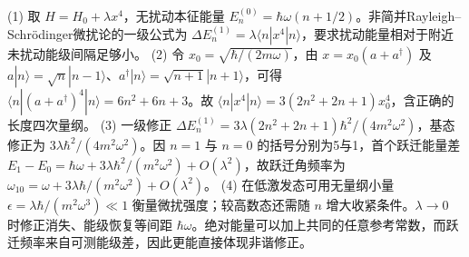 (1) 取 \(H=H_0+\lambda x^4\)，无扰动本征能量 \(E_n^{(0)}=\hbar\omega(n+1/2)\)。非简并Rayleigh–Schrödinger微扰论的一级公式为 \(\Delta E_n^{(1)}=\lambda\langle n|x^4|n\rangle\)，要求扰动能量相对于附近未扰动能级间隔足够小。
(2) 令 \(x_0=\sqrt{\hbar/(2m\omega)}\)，由 \(x=x_0(a+a^\dagger)\) 及 \(a|n\rangle=\sqrt n|n-1\rangle\)、\(a^\dagger|n\rangle=\sqrt{n+1}|n+1\rangle\)，可得 \(\langle n|(a+a^\dagger)^4|n\rangle=6n^2+6n+3\)。故 \(\langle n|x^4|n\rangle=3(2n^2+2n+1)x_0^4\)，含正确的长度四次量纲。
(3) 一级修正 \(\Delta E_n^{(1)}=3\lambda(2n^2+2n+1)\hbar^2/(4m^2\omega^2)\)，基态修正为 \(3\lambda\hbar^2/(4m^2\omega^2)\)。因 \(n=1\) 与 \(n=0\) 的括号分别为5与1，首个跃迁能量差 \(E_1-E_0=\hbar\omega+3\lambda\hbar^2/(m^2\omega^2)+O(\lambda^2)\)，故跃迁角频率为 \(\omega_{10}=\omega+3\lambda\hbar/(m^2\omega^2)+O(\lambda^2)\)。
(4) 在低激发态可用无量纲小量 \(\epsilon=\lambda\hbar/(m^2\omega^3)\ll1\) 衡量微扰强度；较高数态还需随 \(n\) 增大收紧条件。\(\lambda\to0\) 时修正消失、能级恢复等间距 \(\hbar\omega\)。绝对能量可以加上共同的任意参考常数，而跃迁频率来自可测能级差，因此更能直接体现非谐修正。
